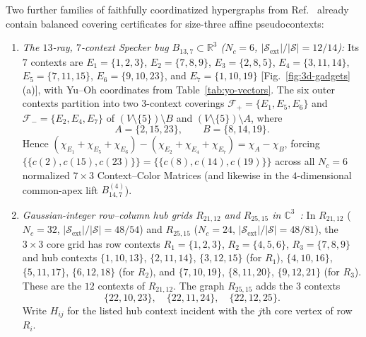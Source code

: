 \documentclass[aps,pra,reprint,superscriptaddress,longbibliography,nofootinbib,floatfix,10pt]{revtex4-2}
\theoremstyle{definition}\newtheorem{definition}[theorem]{Definition}
\theoremstyle{remark}\newtheorem{remark}[theorem]{Remark}
\newcommand{\C}{\mathbb C}\newcommand{\R}{\mathbb R}\newcommand{\Q}{\mathbb Q}
\newcommand{\Sc}{\mathcal S}\newcommand{\Cc}{\mathcal C}\newcommand{\Wc}{\mathcal W}
\begin{document}
Two further families of faithfully coordinatized hypergraphs from Ref.~\cite{2026-latin-context-matrix} already contain balanced covering certificates for size-three affine pseudocontexts:
\begin{enumerate}
\item \emph{The $13$-ray, $7$-context Specker bug $B_{13,7}\subset\R^3$ ($N_c=6$, $|\Sc_{\mathrm{ext}}|/|\Sc|=12/14$):} Its $7$ contexts are $E_1=\{1,2,3\}$, $E_2=\{7,8,9\}$, $E_3=\{2,8,5\}$, $E_4=\{3,11,14\}$, $E_5=\{7,11,15\}$, $E_6=\{9,10,23\}$, and $E_7=\{1,10,19\}$ [Fig.~\ref{fig:3d-gadgets}(a)], with Yu--Oh coordinates from Table~\ref{tab:yo-vectors}. The six outer contexts partition into two $3$-context coverings $\mathcal{F}_+=\{E_1,E_5,E_6\}$ and $\mathcal{F}_-=\{E_2,E_4,E_7\}$ of $(V\setminus\{5\})\setminus B$ and $(V\setminus\{5\})\setminus A$, where
\begin{equation}\label{eq:B13-paired3}
A=\{2,15,23\},\qquad B=\{8,14,19\}.
\end{equation}
Hence $(\chi_{E_1}+\chi_{E_5}+\chi_{E_6})-(\chi_{E_2}+\chi_{E_4}+\chi_{E_7})=\chi_A-\chi_B$, forcing $\{\!\{c(2),c(15),c(23)\}\!\}=\{\!\{c(8),c(14),c(19)\}\!\}$ across all $N_c=6$ normalized $7\times 3$ Context--Color Matrices (and likewise in the $4$-dimensional common-apex lift $B_{14,7}^{(4)}$).

\item \emph{Gaussian-integer row--column hub grids $R_{21,12}$ and $R_{25,15}$ in $\C^3$~\cite[Sec.~IV\,D]{2026-latin-context-matrix}:} In $R_{21,12}$ ($N_c=32$, $|\Sc_{\mathrm{ext}}|/|\Sc|=48/54$) and $R_{25,15}$ ($N_c=24$, $|\Sc_{\mathrm{ext}}|/|\Sc|=48/81$), the $3\times3$ core grid has row contexts $R_1=\{1,2,3\}$, $R_2=\{4,5,6\}$, $R_3=\{7,8,9\}$ and hub contexts $\{1,10,13\}$, $\{2,11,14\}$, $\{3,12,15\}$ (for $R_1$), $\{4,10,16\}$, $\{5,11,17\}$, $\{6,12,18\}$ (for $R_2$), and $\{7,10,19\}$, $\{8,11,20\}$, $\{9,12,21\}$ (for $R_3$). These are the $12$ contexts of $R_{21,12}$. The graph $R_{25,15}$ adds the $3$ contexts
\begin{equation}\label{eq:R25-extra-contexts}
\{22,10,23\},\quad\{22,11,24\},\quad\{22,12,25\}.
\end{equation}
Write $H_{ij}$ for the listed hub context incident with the $j$th core vertex of row $R_i$.


\end{enumerate}
\end{document}
